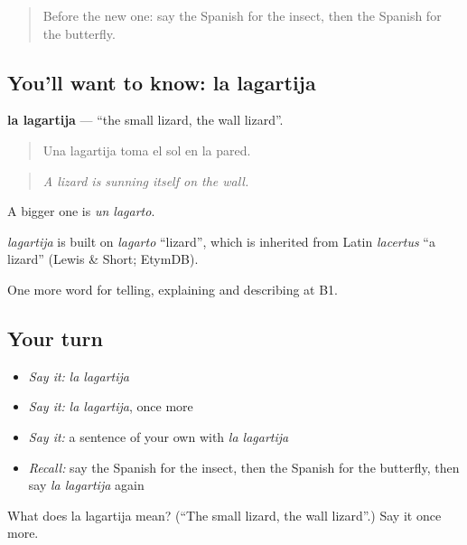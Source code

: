 \label{lesson:ES-C694-lagartija}



\begin{quote}
Before the new one: say the Spanish for the insect, then the Spanish for the butterfly.
\end{quote}

\subsection*{You'll want to know: la lagartija}
\textbf{la lagartija} — \textquotedblleft{}the small lizard, the wall lizard\textquotedblright{}.

\begin{quote}
Una lagartija toma el sol en la pared.
\end{quote}

\begin{quote}
\emph{A lizard is sunning itself on the wall.}
\end{quote}

A bigger one is \emph{un lagarto}.

\begin{cousinweb}
\emph{lagartija} is built on \emph{lagarto} \textquotedblleft{}lizard\textquotedblright{}, which is inherited from Latin \emph{lacertus} \textquotedblleft{}a lizard\textquotedblright{} (Lewis \& Short; EtymDB).
\end{cousinweb}

\begin{grammarlens}[title={What you've built}]
One more word for telling, explaining and describing at B1.
\end{grammarlens}

\subsection*{Your turn}
\begin{itemize}
\raggedright
  \item \emph{Say it:} \emph{la lagartija}
  \item \emph{Say it:} \emph{la lagartija}, once more
  \item \emph{Say it:} a sentence of your own with \emph{la lagartija}
  \item \emph{Recall:} say the Spanish for the insect, then the Spanish for the butterfly, then say \emph{la lagartija} again
\end{itemize}

\begin{tcolorbox}[breakable,colback=teal!4,colframe=teal!35!black,title={Before you move on}]
What does la lagartija mean? (\textquotedblleft{}The small lizard, the wall lizard\textquotedblright{}.) Say it once more.
\end{tcolorbox}
